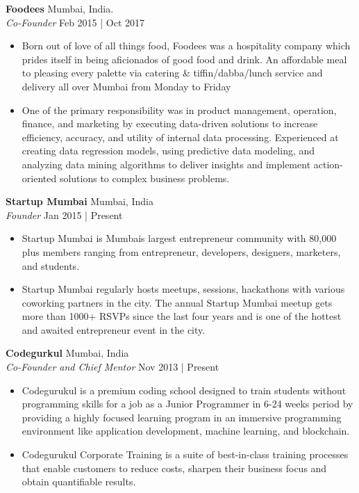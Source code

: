 \documentclass[a4paper]{article}
\begin{document}
\textbf{Foodees} \hfill Mumbai, India.\\
\textit{Co-Founder} \hfill Feb 2015 | Oct 2017\\
\vspace{-1mm}
\begin{itemize} \itemsep 1pt
	\item Born out of love of all things food, Foodees was a hospitality company which prides itself in being aficionados of good food and drink. An affordable meal to pleasing every palette via catering \& tiffin/dabba/lunch service and delivery all over Mumbai from Monday to Friday
	\item One of the primary responsibility was in product management, operation, finance, and marketing by executing data-driven solutions to increase efficiency, accuracy, and utility of internal data processing. Experienced at creating data regression models, using predictive data modeling, and analyzing data mining algorithms to deliver insights and implement action-oriented solutions to complex business problems.
\end{itemize}
\textbf{Startup Mumbai} \hfill Mumbai, India\\
\textit{Founder} \hfill Jan 2015 | Present\\
\vspace{-1mm}
\begin{itemize} \itemsep 1pt
	\item Startup Mumbai is Mumbai\textquotesingle{}s largest entrepreneur community with 80,000 plus members ranging from entrepreneur, developers, designers, marketers, and students.
	\item Startup Mumbai regularly hosts meetups, sessions, hackathons with various coworking partners in the city. The annual Startup Mumbai meetup gets more than 1000+ RSVPs since the last four years and is one of the hottest and awaited entrepreneur event in the city.
\end{itemize}
\textbf{Codegurkul} \hfill Mumbai, India\\
\textit{Co-Founder and Chief Mentor} \hfill Nov 2013 | Present\\
\vspace{-1mm}
\begin{itemize} \itemsep 1pt
	\item Codegurukul is a premium coding school designed to train students without programming skills for a job as a Junior Programmer in 6-24 weeks period by providing a highly focused learning program in an immersive programming environment like application development, machine learning, and blockchain.
	\item Codegurukul Corporate Training is a suite of best-in-class training processes that enable customers to reduce costs, sharpen their business focus and obtain quantifiable results.
\end{itemize}
\end{document}
